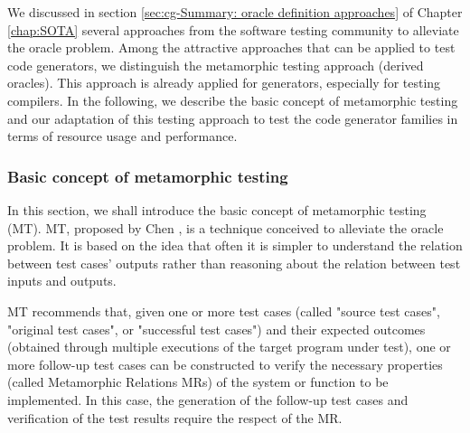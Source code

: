 We discussed in section \ref{sec:cg-Summary: oracle definition approaches} of Chapter \ref{chap:SOTA} several approaches from the software testing community to alleviate the oracle problem. Among the attractive approaches that can be applied to test code generators, we distinguish the metamorphic testing approach (derived oracles). This approach is already applied for generators, especially for testing compilers\cite{donaldson2016metamorphic,tao2010automatic,le2014compiler}. In the following, we describe the basic concept of metamorphic testing and our adaptation of this testing approach to test the code generator families in terms of resource usage and performance.

\subsubsection{Basic concept of metamorphic testing}
In this section, we shall introduce the basic concept of metamorphic testing (MT). 
MT, proposed by Chen \etal \cite{chen1998metamorphic}, is a technique conceived to alleviate the oracle problem. It is based on the idea that often it is simpler to understand the relation between test cases' outputs rather than reasoning about the relation between test inputs and outputs. 

MT recommends that, given one or more test cases (called "source test cases", "original test cases", or "successful test cases") and their expected outcomes (obtained through multiple executions of the target program under test), one or more follow-up test cases can be constructed to verify the necessary properties (called Metamorphic Relations MRs) of the system or function to be implemented. In this case, the generation of the follow-up test cases and verification of the test results require the respect of the MR.


